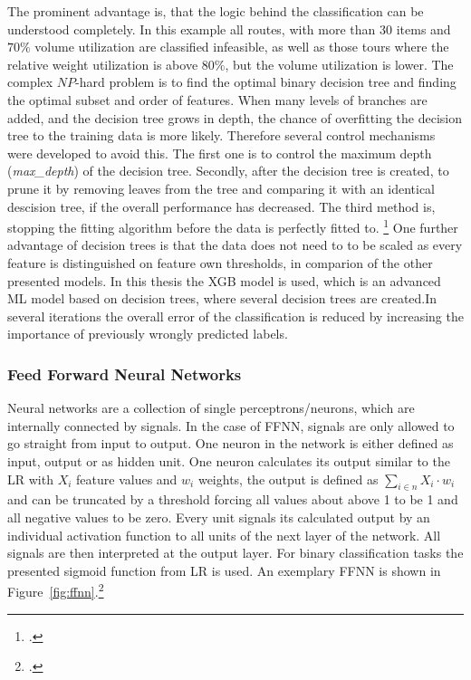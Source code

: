 
The  prominent advantage is, that the logic behind the classification can be understood
completely. In this example all routes, with more than 30 items and $70\%$ volume utilization are classified infeasible,
as well as those tours where the relative weight utilization is above $80\%$, but the volume utilization is lower. The complex
$NP$-hard problem is to find the optimal binary decision tree and finding the optimal subset and order of
features.
When many levels of branches are added, and the decision tree grows in depth, the chance of
overfitting the decision tree to the training data is more likely. Therefore several control mechanisms
were developed to avoid this. The first one is to control the maximum depth (\textit{max\_depth})
of the decision tree. Secondly, after the decision tree is created, to prune it by removing leaves from
the tree and comparing it with an identical descision tree, if the overall performance has decreased.
The third method is, stopping the fitting algorithm before the data is perfectly fitted to. \footcite[cf.][p. 252]{kotsiantis_supervised_2007}
One further advantage of decision trees is that the data does not need to to be scaled as every feature is
distinguished on feature own thresholds, in comparion of the other presented models. In this thesis the \gls{XGB} model is used,
which is an advanced \gls{ML} model based on decision trees, where several decision trees are created.In several iterations
the overall error of the classification is reduced by increasing the importance of previously wrongly predicted labels.

\subsubsection{Feed Forward Neural Networks}

Neural networks are a collection of single perceptrons/neurons, which are internally connected by
signals. In the case of \gls{FFNN}, signals are only allowed to go straight from input to output. One neuron
in the network is either defined as input, output or as hidden unit. One neuron calculates its
output similar to the \gls{LR} with $X_i$ feature values and $w_i$ weights, the output is defined
as $\sum_{i \in n} X_i \cdot w_i$ and can be truncated by a threshold forcing all values about above 1
to be 1 and all negative values to be zero. Every unit signals its calculated output by an individual
activation function to all units of the next layer of the network. All signals are
then interpreted at the output layer. For binary classification tasks the presented sigmoid function from \gls{LR} is used.
An exemplary \gls{FFNN} is shown in Figure~\ref{fig:ffnn}.\footcite[cf.][p. 255]{kotsiantis_supervised_2007}

